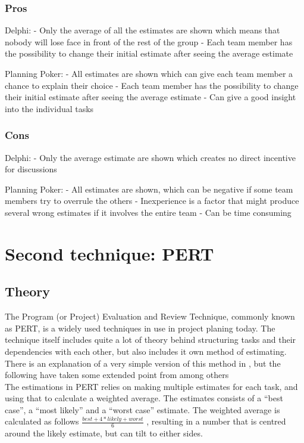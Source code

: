 \subsubsection{Pros}

Delphi: 
- Only the average of all the estimates are shown which means that nobody will lose face in front of the rest of the group
- Each team member has the possibility to change their initial estimate after seeing the average estimate

Planning Poker:
- All estimates are shown which can give each team member a chance to explain their choice
- Each team member has the possibility to change their initial estimate after seeing the average estimate
- Can give a good insight into the individual tasks




\subsubsection{Cons}

Delphi:
- Only the average estimate are shown which creates no direct incentive for discussions

Planning Poker:
- All estimates are shown, which can be negative if some team members try to overrule the others
- Inexperience is a factor that might produce several wrong estimates if it involves the entire team
- Can be time consuming

\section{Second technique: PERT}
\subsection{Theory}

The Program (or Project) Evaluation and Review Technique, commonly known as PERT, is a widely used techniques in use in project planing today. The technique itself includes quite a lot of theory behind structuring tasks and their dependencies with each other, but also includes it own method of estimating. There is an explanation of a very simple version of this method in \cite[p.152]{ProjectManagement_b}, but the following have taken some extended point from \cite{TynerBlain_w} among others\\

The estimations in PERT relies on making multiple estimates for each task, and using that to calculate a weighted average. The estimates consists of a ``best case'', a ``most likely'' and a ``worst case'' estimate. The weighted average is calculated as follows
$\frac{best+4*likely+worst}{6}$
, resulting in a number that is centred around the likely estimate, but can tilt to either sides.\
 
